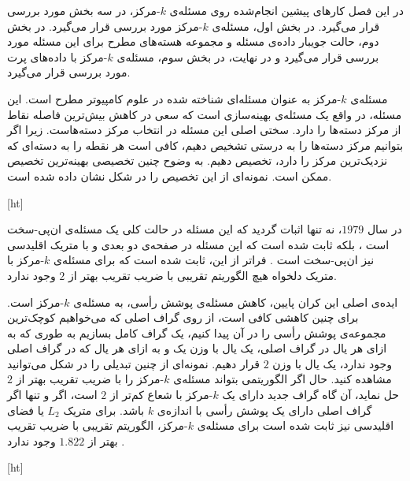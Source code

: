 

در این فصل کارهای پیشین انجام‌شده روی مسئله‌ی $k$-مرکز، در سه بخش مورد بررسی قرار می‌گیرد.
در بخش اول، مسئله‌ی $k$-مرکز مورد بررسی قرار می‌گیرد.
در بخش دوم، حالت جویبار داده‌ی مسئله و مجموعه هسته‌های مطرح برای این مسئله مورد بررسی قرار می‌گیرد و در نهایت، در بخش سوم، مسئله‌ی $k$-مرکز با داده‌های پرت مورد بررسی قرار می‌گیرد.


مسئله‌ی $k$-مرکز به عنوان مسئله‌ای شناخته شده در علوم کامپیوتر مطرح است.
این مسئله، در واقع یک مسئله‌ی بهینه‌سازی است که سعی در کاهش بیش‌ترین فاصله نقاط از مرکز دسته‌ها را دارد.
سختی اصلی این مسئله در انتخاب مرکز دسته‌هاست.
زیرا اگر بتوانیم مرکز دسته‌ها را به درستی تشخیص دهیم، کافی است هر نقطه را به دسته‌ای که نزدیک‌ترین مرکز را دارد، تخصیص دهیم.
به وضوح چنین تخصیصی بهینه‌ترین تخصیص ممکن است.
نمونه‌ای از این تخصیص را در شکل  نشان داده شده است.

[ht]

در سال $1979$، نه تنها اثبات گردید که این مسئله در حالت کلی یک مسئله‌ی ان‌پی-سخت است ، بلکه ثابت شده است که این مسئله در صفحه‌ی دو بعدی و با متریک اقلیدسی نیز ان‌پی-سخت است .
فراتر از این، ثابت شده است که برای مسئله‌ی $k$-مرکز با متریک دلخواه هیچ الگوریتم تقریبی با ضریب تقریب بهتر از $2$ وجود ندارد.

ایده‌ی اصلی این کران پایین، کاهش مسئله‌ی پوشش رأسی، به مسئله‌ی $k$-مرکز است.
برای چنین کاهشی کافی است، از روی گراف اصلی که می‌خواهیم کوچک‌ترین مجموعه‌ی پوشش رأسی را در آن پیدا کنیم، یک گراف کامل بسازیم به طوری که به ازای هر یال در گراف اصلی، یک یال با وزن یک و به ازای هر یال که در گراف اصلی وجود ندارد، یک یال با وزن $2$ قرار دهیم.
نمونه‌ای از چنین تبدیلی را در شکل  می‌توانید مشاهده کنید.
حال اگر الگوریتمی بتواند مسئله‌ی $k$-مرکز را با ضریب تقریب بهتر از $2$ حل نماید، آن گاه گراف جدید دارای یک $k$-مرکز با شعاع کم‌تر از $2$ است، اگر و تنها اگر گراف اصلی دارای یک پوشش رأسی با اندازه‌ی $k$ باشد.
برای متریک $L_2$ یا فضای اقلیدسی نیز ثابت شده است برای مسئله‌ی $k$-مرکز، الگوریتم تقریبی با ضریب تقریب بهتر از $1.822$ وجود ندارد .

[ht]

